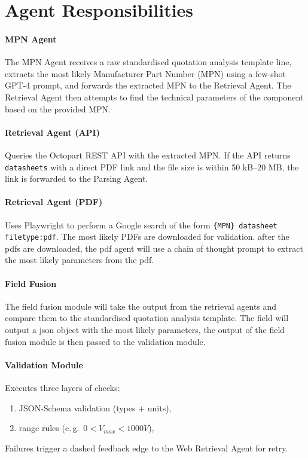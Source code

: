 \section{Agent Responsibilities}
\paragraph{MPN Agent}  
The MPN Agent receives a raw standardised quotation analysis template line, extracts the most likely Manufacturer Part Number (MPN) using a few-shot GPT-4 prompt, and forwards the extracted MPN to the Retrieval Agent. The Retrieval Agent then attempts to find the technical parameters of the component based on the provided MPN.


\paragraph{Retrieval Agent (API)}  
Queries the Octopart REST API with the extracted MPN.  
If the API returns \verb|datasheets| with a direct PDF link and the file size is within 50 kB–20 MB, the link is forwarded to the Parsing Agent.

\paragraph{Retrieval Agent (PDF)}  
Uses Playwright to perform a Google search of the form  
\texttt{\{MPN\} datasheet filetype:pdf}.  
The most likely PDFs are downloaded for validation.
after the pdfs are downloaded, the pdf agent will use a chain of thought prompt to extract the most likely parameters from the pdf.

\paragraph{Field Fusion}
The field fusion module will take the output from the retrieval agents and compare them to the standardised quotation analysis template.
The field will output a json object with the most likely parameters, the output of the field fusion module is then passed to the validation module.

\paragraph{Validation Module}  
Executes three layers of checks:
\begin{enumerate}
  \item JSON-Schema validation (types + units),
  \item range rules (e.\,g.\ $0 < V_{max} < 1000V$),
\end{enumerate}  
Failures trigger a dashed feedback edge to the Web Retrieval Agent for retry.

